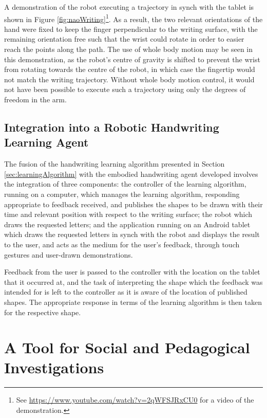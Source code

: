 \documentclass{sig-alternate}
\begin{document}
A demonstration of the robot executing a trajectory in synch with the tablet is
shown in Figure \ref{fig:naoWriting}\footnote{See
\url{https://www.youtube.com/watch?v=2qWFSJRxCU0} for a video of the
demonstration. }. As a result, the two relevant orientations of the hand were
fixed to keep the finger perpendicular to the writing surface, with the
remaining orientation free such that the wrist could rotate in order to easier
reach the points along the path. The use of whole body motion may be seen in
this demonstration, as the robot's centre of gravity is shifted to prevent the
wrist from rotating towards the centre of the robot, in which case the fingertip
would not match the writing trajectory. Without whole body motion control, it
would not have been possible to execute such a trajectory using only the degrees
of freedom in the arm.


\subsection{Integration into a Robotic Handwriting Learning Agent}

The fusion of the handwriting learning algorithm presented in Section
\ref{sec:learningAlgorithm} with the embodied handwriting agent developed
involves the integration of three components: the controller of the learning
algorithm, running on a computer, which manages the learning algorithm,
responding appropriate to feedback received, and publishes the shapes to be
drawn with their time and relevant position with respect to the writing surface;
the robot which draws the requested letters; and the application running on an
Android tablet which draws the requested letters in synch with the robot and
displays the result to the user, and acts as the medium for the user's feedback,
through touch gestures and user-drawn demonstrations.

Feedback from the user is passed to the controller with the location on the
tablet that it occurred at, and the task of interpreting the shape which the
feedback was intended for is left to the controller as it is aware of the
location of published shapes. The appropriate response in terms of the learning
algorithm is then taken for the respective shape. 



\section{A Tool for Social and Pedagogical Investigations} \label{sec:experiment}
\label{sec4}
\end{document}
